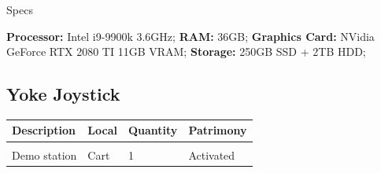 {\Large Specs}
\vspace{1em}

\textbf{Processor:} Intel i9-9900k 3.6GHz; \textbf{RAM:} 36GB; \textbf{Graphics Card:} NVidia GeForce RTX 2080 TI 11GB VRAM; \textbf{Storage:} 250GB SSD + 2TB HDD;
\newpage

\subsection{Yoke Joystick}
\begin{tabularx}{\textwidth}{ Y  Y  Y  Y }
    \textbf{Description} &  \textbf{Local} &  \textbf{Quantity} & \textbf{Patrimony}\\
    \hline \\
     Demo station & Cart & 1 & Activated
\end{tabularx}
\vspace{1cm}

